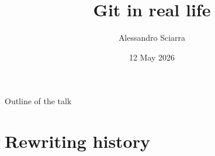 \documentclass[usenames,svgnames,14pt]{beamer}
\title{Git in real life}
\date{12 May 2026}
\author{Alessandro Sciarra}
\institute{CRC-TR\,211~--~Software Development Center}%
\begin{document}
\begin{frame}
    \titlepage
\end{frame}
\begin{frame}{Outline of the talk}
    \tableofcontents[subsectionstyle=hide]
\end{frame}


\section{Rewriting history}
\end{document}
